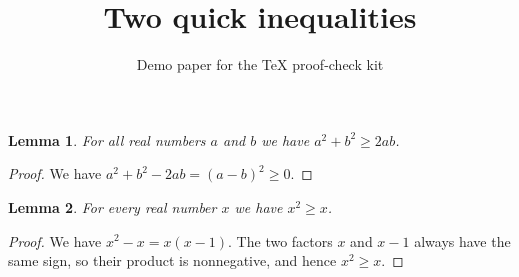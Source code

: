 \documentclass[11pt]{article}
\title{Two quick inequalities}
\author{Demo paper for the TeX proof-check kit}
\date{}
\newtheorem{lemma}{Lemma}
\begin{document}
\maketitle

\begin{lemma}\label{lem:square}
For all real numbers $a$ and $b$ we have $a^2 + b^2 \ge 2ab$.
\end{lemma}

\begin{proof}
We have $a^2 + b^2 - 2ab = (a-b)^2 \ge 0$.
\end{proof}

\begin{lemma}\label{lem:xsquare}
For every real number $x$ we have $x^2 \ge x$.
\end{lemma}

\begin{proof}
We have $x^2 - x = x(x-1)$. The two factors $x$ and $x-1$ always have the same
sign, so their product is nonnegative, and hence $x^2 \ge x$.
\end{proof}
\end{document}
